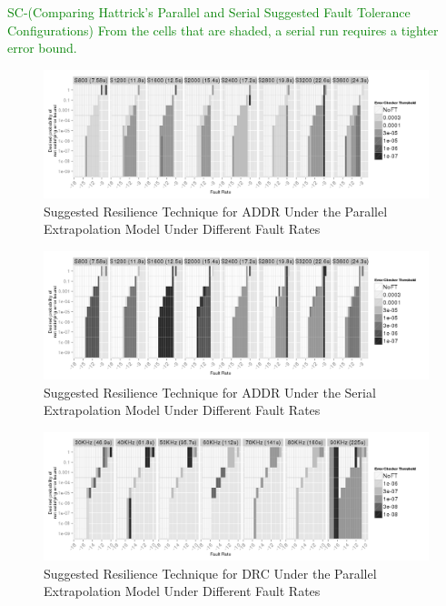 \documentclass{sig-alternate}
\newcommand{\sui}[1]{%
  \textcolor{green}{SC-#1}
}
\begin{document}
{\sui{(Comparing Hattrick's Parallel and Serial Suggested Fault Tolerance Configurations)
From the cells that are shaded, a serial run requires a tighter error bound.}

\begin{figure}[ht!]
\centering
\includegraphics[width=7in]{figs/Lasso_Parallel_SuggestedConf.png}
\vspace{-10pt}
\caption{Suggested Resilience Technique for ADDR Under the Parallel Extrapolation Model Under Different Fault Rates}
\vspace{-10pt}
\label{fig:Lasso_Parallel_SuggestedConf}
\end{figure}

\begin{figure}[ht!]
\centering
\includegraphics[width=7in]{figs/Lasso_Serial_SuggestedConf.png}
\vspace{-10pt}
\caption{Suggested Resilience Technique for ADDR Under the Serial Extrapolation Model Under Different Fault Rates}
\vspace{-10pt}
\label{fig:Lasso_Serial_SuggestedConf}
\end{figure}

\begin{figure}[ht!]
\centering
\includegraphics[width=7in]{figs/DRC_Parallel_SuggestedConf.png}
\vspace{-10pt}
\caption{Suggested Resilience Technique for DRC Under the Parallel Extrapolation Model Under Different Fault Rates}
\vspace{-10pt}
\label{fig:DRC_Parallel_SuggestedConf}
\end{figure}

}
\end{document}
